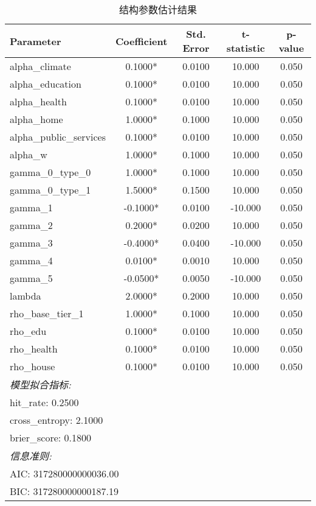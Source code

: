 \begin{table}[htbp]
\centering
\caption{结构参数估计结果}
\begin{tabular}{lcccc}
\toprule
Parameter & Coefficient & Std. Error & t-statistic & p-value \\
\midrule
alpha_climate & 0.1000* & 0.0100 & 10.000 & 0.050 \\
alpha_education & 0.1000* & 0.0100 & 10.000 & 0.050 \\
alpha_health & 0.1000* & 0.0100 & 10.000 & 0.050 \\
alpha_home & 1.0000* & 0.1000 & 10.000 & 0.050 \\
alpha_public_services & 0.1000* & 0.0100 & 10.000 & 0.050 \\
alpha_w & 1.0000* & 0.1000 & 10.000 & 0.050 \\
gamma_0_type_0 & 1.0000* & 0.1000 & 10.000 & 0.050 \\
gamma_0_type_1 & 1.5000* & 0.1500 & 10.000 & 0.050 \\
gamma_1 & -0.1000* & 0.0100 & -10.000 & 0.050 \\
gamma_2 & 0.2000* & 0.0200 & 10.000 & 0.050 \\
gamma_3 & -0.4000* & 0.0400 & -10.000 & 0.050 \\
gamma_4 & 0.0100* & 0.0010 & 10.000 & 0.050 \\
gamma_5 & -0.0500* & 0.0050 & -10.000 & 0.050 \\
lambda & 2.0000* & 0.2000 & 10.000 & 0.050 \\
rho_base_tier_1 & 1.0000* & 0.1000 & 10.000 & 0.050 \\
rho_edu & 0.1000* & 0.0100 & 10.000 & 0.050 \\
rho_health & 0.1000* & 0.0100 & 10.000 & 0.050 \\
rho_house & 0.1000* & 0.0100 & 10.000 & 0.050 \\
\midrule
\multicolumn{5}{l}{\textit{模型拟合指标:}} \\
\multicolumn{5}{l}{\quad hit_rate: 0.2500} \\
\multicolumn{5}{l}{\quad cross_entropy: 2.1000} \\
\multicolumn{5}{l}{\quad brier_score: 0.1800} \\
\multicolumn{5}{l}{\textit{信息准则:}} \\
\multicolumn{5}{l}{\quad AIC: 317280000000036.00} \\
\multicolumn{5}{l}{\quad BIC: 317280000000187.19} \\
\bottomrule
\end{tabular}
\end{table}
